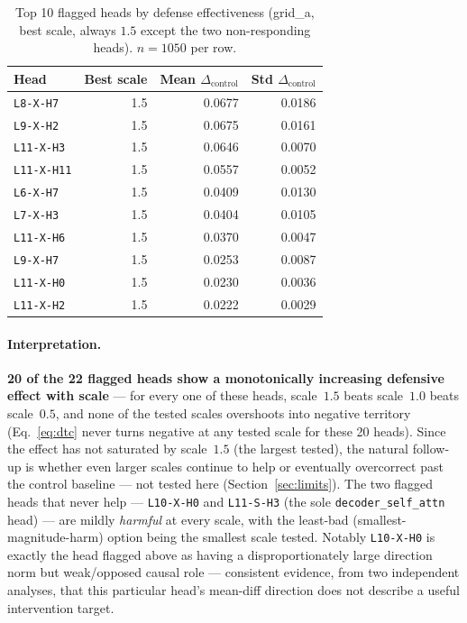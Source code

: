 \documentclass[11pt]{article}
\newcommand{\dtc}{\ensuremath{\Delta_{\text{control}}}}
\begin{document}
\begin{table}[H]
\centering
\caption{Top 10 flagged heads by defense effectiveness (grid\_a, best
scale, always $1.5$ except the two non-responding heads). $n{=}1050$ per
row.}
\label{tab:topdefense}
\begin{tabular}{lrrr}
\toprule
Head & Best scale & Mean $\dtc$ & Std $\dtc$ \\
\midrule
\texttt{L8-X-H7}  & 1.5 & 0.0677 & 0.0186 \\
\texttt{L9-X-H2}  & 1.5 & 0.0675 & 0.0161 \\
\texttt{L11-X-H3} & 1.5 & 0.0646 & 0.0070 \\
\texttt{L11-X-H11}& 1.5 & 0.0557 & 0.0052 \\
\texttt{L6-X-H7}  & 1.5 & 0.0409 & 0.0130 \\
\texttt{L7-X-H3}  & 1.5 & 0.0404 & 0.0105 \\
\texttt{L11-X-H6} & 1.5 & 0.0370 & 0.0047 \\
\texttt{L9-X-H7}  & 1.5 & 0.0253 & 0.0087 \\
\texttt{L11-X-H0} & 1.5 & 0.0230 & 0.0036 \\
\texttt{L11-X-H2} & 1.5 & 0.0222 & 0.0029 \\
\bottomrule
\end{tabular}
\end{table}

\paragraph{Interpretation.} \textbf{20 of the 22 flagged heads show a
monotonically increasing defensive effect with scale} --- for every one of
these heads, scale~$1.5$ beats scale~$1.0$ beats scale~$0.5$, and none of
the tested scales overshoots into negative territory (Eq.~\ref{eq:dtc}
never turns negative at any tested scale for these 20 heads). Since the
effect has not saturated by scale~$1.5$ (the largest tested), the natural
follow-up is whether even larger scales continue to help or eventually
overcorrect past the control baseline --- not tested here
(Section~\ref{sec:limits}). The two flagged heads that never help ---
\texttt{L10-X-H0} and \texttt{L11-S-H3} (the sole \texttt{decoder\_self\_attn}
head) --- are mildly \emph{harmful} at every scale, with the least-bad
(smallest-magnitude-harm) option being the smallest scale tested. Notably
\texttt{L10-X-H0} is exactly the head flagged above as having a
disproportionately large direction norm but weak/opposed causal role ---
consistent evidence, from two independent analyses, that this particular
head's mean-diff direction does not describe a useful intervention target.
\end{document}
